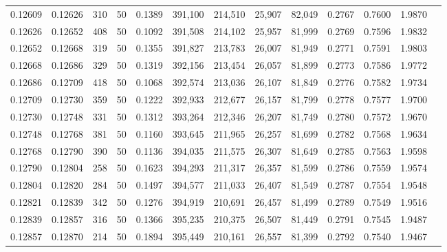 \begin{tabular}{rrrrrrrrrrrrr}
0.12609 & 0.12626 &   310 &  50 &                                     0.1389 & 391,100 & 214,510 &  25,907 &  82,049 & 0.2767 & 0.7600 & 1.9870 \\
0.12626 & 0.12652 &   408 &  50 &                                     0.1092 & 391,508 & 214,102 &  25,957 &  81,999 & 0.2769 & 0.7596 & 1.9832 \\
0.12652 & 0.12668 &   319 &  50 &                                     0.1355 & 391,827 & 213,783 &  26,007 &  81,949 & 0.2771 & 0.7591 & 1.9803 \\
0.12668 & 0.12686 &   329 &  50 &                                     0.1319 & 392,156 & 213,454 &  26,057 &  81,899 & 0.2773 & 0.7586 & 1.9772 \\
0.12686 & 0.12709 &   418 &  50 &                                     0.1068 & 392,574 & 213,036 &  26,107 &  81,849 & 0.2776 & 0.7582 & 1.9734 \\
0.12709 & 0.12730 &   359 &  50 &                                     0.1222 & 392,933 & 212,677 &  26,157 &  81,799 & 0.2778 & 0.7577 & 1.9700 \\
0.12730 & 0.12748 &   331 &  50 &                                     0.1312 & 393,264 & 212,346 &  26,207 &  81,749 & 0.2780 & 0.7572 & 1.9670 \\
0.12748 & 0.12768 &   381 &  50 &                                     0.1160 & 393,645 & 211,965 &  26,257 &  81,699 & 0.2782 & 0.7568 & 1.9634 \\
0.12768 & 0.12790 &   390 &  50 &                                     0.1136 & 394,035 & 211,575 &  26,307 &  81,649 & 0.2785 & 0.7563 & 1.9598 \\
0.12790 & 0.12804 &   258 &  50 &                                     0.1623 & 394,293 & 211,317 &  26,357 &  81,599 & 0.2786 & 0.7559 & 1.9574 \\
0.12804 & 0.12820 &   284 &  50 &                                     0.1497 & 394,577 & 211,033 &  26,407 &  81,549 & 0.2787 & 0.7554 & 1.9548 \\
0.12821 & 0.12839 &   342 &  50 &                                     0.1276 & 394,919 & 210,691 &  26,457 &  81,499 & 0.2789 & 0.7549 & 1.9516 \\
0.12839 & 0.12857 &   316 &  50 &                                     0.1366 & 395,235 & 210,375 &  26,507 &  81,449 & 0.2791 & 0.7545 & 1.9487 \\
0.12857 & 0.12870 &   214 &  50 &                                     0.1894 & 395,449 & 210,161 &  26,557 &  81,399 & 0.2792 & 0.7540 & 1.9467 \\

\end{tabular}
